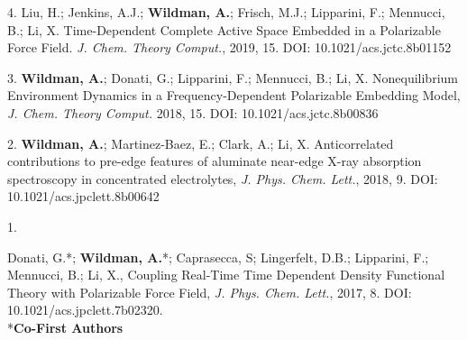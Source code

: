 \begin{cvpublications}
\cvpublication
{4.} 
{Liu, H.; Jenkins, A.J.; \textbf{Wildman, A.}; Frisch, M.J.; Lipparini, F.; Mennucci,
B.; Li, X. Time-Dependent Complete Active Space Embedded in a Polarizable Force
Field.  \textit{J. Chem. Theory Comput.}, 2019, 15. DOI:
10.1021/acs.jctc.8b01152} 


\cvpublication
{3.} 
{\textbf{Wildman, A.}; Donati, G.; Lipparini, F.; Mennucci, B.; Li, X.
Nonequilibrium Environment Dynamics in a Frequency-Dependent Polarizable
Embedding Model, \textit{J. Chem. Theory Comput.} 2018, 15. DOI:
10.1021/acs.jctc.8b00836} 


\cvpublication
{2.} 
{\textbf{Wildman, A.}; Martinez-Baez, E.; Clark, A.; Li, X. Anticorrelated
contributions to pre-edge features of aluminate near-edge X-ray absorption
spectroscopy in concentrated electrolytes, \textit{J. Phys. Chem. Lett.},
2018, 9. DOI: 10.1021/acs.jpclett.8b00642} 


\cvpublication
{1.}
{\parbox[t]{0.95\textwidth}{\strut Donati, G.*; \textbf{Wildman, A.}*; Caprasecca, S; Lingerfelt, D.B.; Lipparini,
F.; Mennucci, B.; Li, X., Coupling Real-Time Time Dependent Density Functional
Theory with Polarizable Force Field, \textit{J. Phys. Chem. Lett.}, 2017, 8.
DOI: 10.1021/acs.jpclett.7b02320. \\ \**\textbf{Co-First Authors}}}



\end{cvpublications}
\vspace{-1cm}

